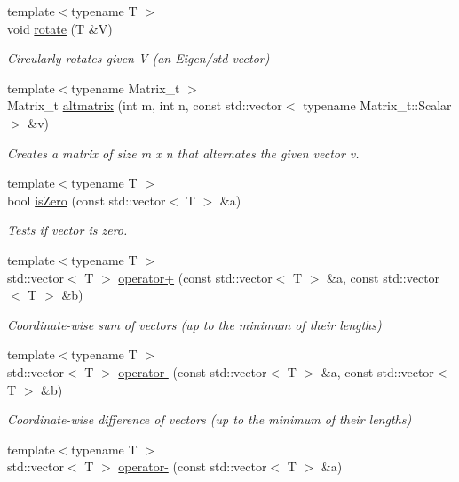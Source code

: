 \begin{DoxyCompactItemize}
{\footnotesize template$<$typename T $>$ }\\void \hyperlink{namespaceMackey_a38a833de54971845cbdb8c96f830725b}{rotate} (T \&V)
\begin{DoxyCompactList}\small\item\em Circularly rotates given V (an Eigen/std vector) \end{DoxyCompactList}\item 
{\footnotesize template$<$typename Matrix\+\_\+t $>$ }\\Matrix\+\_\+t \hyperlink{namespaceMackey_a26a529f63caac9c5b4dc809e0e5831be}{altmatrix} (int m, int n, const std\+::vector$<$ typename Matrix\+\_\+t\+::\+Scalar $>$ \&v)
\begin{DoxyCompactList}\small\item\em Creates a matrix of size m x n that alternates the given vector v. \end{DoxyCompactList}\item 
{\footnotesize template$<$typename T $>$ }\\bool \hyperlink{namespaceMackey_a4c3647777bc890a4649ae24b138bbb79}{is\+Zero} (const std\+::vector$<$ T $>$ \&a)
\begin{DoxyCompactList}\small\item\em Tests if vector is zero. \end{DoxyCompactList}\item 
{\footnotesize template$<$typename T $>$ }\\std\+::vector$<$ T $>$ \hyperlink{namespaceMackey_adb4974b5ffe533abb955ccb6b9096155}{operator+} (const std\+::vector$<$ T $>$ \&a, const std\+::vector$<$ T $>$ \&b)
\begin{DoxyCompactList}\small\item\em Coordinate-\/wise sum of vectors (up to the minimum of their lengths) \end{DoxyCompactList}\item 
{\footnotesize template$<$typename T $>$ }\\std\+::vector$<$ T $>$ \hyperlink{namespaceMackey_ae86e49097ef9a09ebcd0173881e88786}{operator-\/} (const std\+::vector$<$ T $>$ \&a, const std\+::vector$<$ T $>$ \&b)
\begin{DoxyCompactList}\small\item\em Coordinate-\/wise difference of vectors (up to the minimum of their lengths) \end{DoxyCompactList}\item 
{\footnotesize template$<$typename T $>$ }\\std\+::vector$<$ T $>$ \hyperlink{namespaceMackey_a9d67cfe3e93ac3ef2301547372b48e15}{operator-\/} (const std\+::vector$<$ T $>$ \&a)

\end{DoxyCompactItemize}
